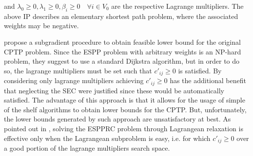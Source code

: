and $\lambda_0 \ge 0, \lambda_1 \ge 0, \beta_i \ge 0 \quad \forall i \in V_0$ are the respective Lagrange multipliers.
The above IP describes an elementary shortest path problem, where the associated weights may be negative.

\cite{beasley1989algorithm} propose a subgradient procedure to obtain feasible lower bound for the original CPTP problem.
Since the ESPP problem with arbitrary weights is an NP-hard problem, they suggest to use a standard Dijkstra algorithm, but in order to do so, the lagrange multipliers must be set such that $c'_{ij} \ge 0$ is satisfied.
By considering only lagrange multipliers achieving $c'_{ij} \ge 0$ has the additional benefit that neglecting the SEC were justified since these would be automatically satisfied.
The advantage of this approach is that it allows for the usage of simple of the shelf algorithms to obtain lower bounds for the CPTP.
But, unfortunately, the lower bounds generated by such approach are unsatisfactory at best.
As pointed out in \cite{righini2004dynamic}, solving the ESPPRC problem through Lagrangean relaxation is effective only when the Lagrangean subproblem is easy, i.e. for which $c'_{ij} \ge 0$ over a good portion of the lagrange multipliers search space.
